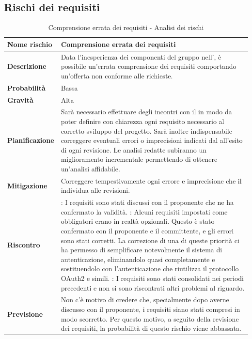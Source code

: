 \documentclass[12pt,a4paper]{article}
\begin{document}
\subsection{Rischi dei requisiti}

\begin{table}[H]
	\begin{center}
		\begin{tabular}{p{} p{}}
			\toprule
			\textbf{Nome rischio} & \textbf{Comprensione errata dei requisiti} \\
			\midrule
			\midrule
			\textbf{Descrizione} & Data l’inesperienza dei componenti del gruppo nell’\AdR{}, è possibile un’errata comprensione dei requisiti comportando un’offerta non conforme alle richieste. \\
			\midrule
			\textbf{Probabilità} & Bassa \\
			\midrule
			\textbf{Gravità} & Alta \\
			\midrule
			\textbf{Pianificazione} &  Sarà necessario effettuare degli incontri con il \mgls{proponente} in modo da poter definire con chiarezza ogni requisito necessario al corretto sviluppo del progetto. Sarà inoltre indispensabile correggere eventuali errori o imprecisioni indicati dal \mgls{committente} all’esito di ogni revisione. Le analisi redatte subiranno un miglioramento incrementale permettendo di ottenere un’analisi affidabile. \\
			\midrule
			\textbf{Mitigazione} & Correggere tempestivamente ogni errore e imprecisione che il \mgls{committente} individua alle revisioni. \\
            \midrule
            \textbf{Riscontro} & 
                \textbf{\FA{}}: I requisiti sono stati discussi con il proponente che ne ha confermato la 
                    validità. \newline
                \textbf{\FAD{}}: Alcuni requisiti impostati come obbligatori erano in realtà opzionali.
                    Questo è stato confermato con il proponente e il committente, e gli errori sono stati corretti.
                    La correzione di una di queste priorità ci ha permesso di semplificare notevolmente
                    il sistema di autenticazione, eliminandolo quasi completamente e sostituendolo con
                    l'autenticazione che riutilizza il protocollo OAuth2 e simili. \newline
                \textbf{\FPA{}}: I requisiti sono stati consolidati nei periodi precedenti e non si sono riscontrati
                    altri problemi al riguardo. \\
            \midrule
            \textbf{Previsione} & Non c'è motivo di credere che, specialmente dopo averne discusso con il proponente, i requisiti siano stati compresi in modo scorretto. Per questo motivo, a seguito della revisione dei requisiti, la probabilità di questo rischio viene abbassata. \\
			\bottomrule
		\end{tabular}
		\caption{Comprensione errata dei requisiti - Analisi dei rischi}
	\end{center}
\end{table}
\end{document}
